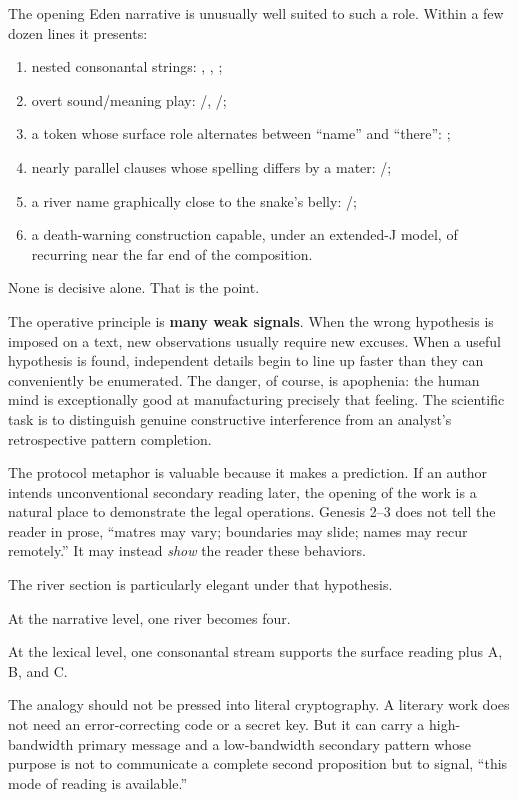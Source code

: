 The opening Eden narrative is unusually well suited to such a role.  Within a few dozen lines it presents:

\begin{enumerate}
\item nested consonantal strings: , , ;
\item overt sound/meaning play: /, /;
\item a token whose surface role alternates between ``name'' and ``there'': ;
\item nearly parallel clauses whose spelling differs by a mater: /;
\item a river name graphically close to the snake's belly: /;
\item a death-warning construction capable, under an extended-J model, of recurring near the far end of the composition.
\end{enumerate}

None is decisive alone.  That is the point.

The operative principle is \textbf{many weak signals}.  When the wrong hypothesis is imposed on a text, new observations usually require new excuses.  When a useful hypothesis is found, independent details begin to line up faster than they can conveniently be enumerated.  The danger, of course, is apophenia: the human mind is exceptionally good at manufacturing precisely that feeling.  The scientific task is to distinguish genuine constructive interference from an analyst's retrospective pattern completion.

The protocol metaphor is valuable because it makes a prediction.  If an author intends unconventional secondary reading later, the opening of the work is a natural place to demonstrate the legal operations.  Genesis 2--3 does not tell the reader in prose, ``matres may vary; boundaries may slide; names may recur remotely.''  It may instead \emph{show} the reader these behaviors.

The river section is particularly elegant under that hypothesis.

At the narrative level, one river becomes four.

At the lexical level, one consonantal stream supports the surface reading plus A, B, and C.

The analogy should not be pressed into literal cryptography.  A literary work does not need an error-correcting code or a secret key.  But it can carry a high-bandwidth primary message and a low-bandwidth secondary pattern whose purpose is not to communicate a complete second proposition but to signal, ``this mode of reading is available.''

